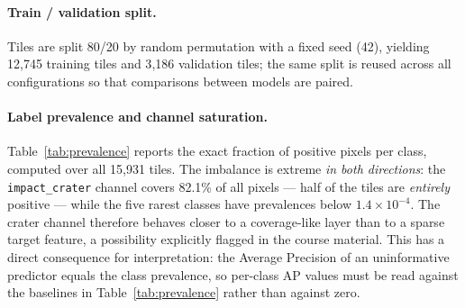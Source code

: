 \documentclass{aa}
\begin{document}
\paragraph{Train / validation split.}
Tiles are split 80/20 by random permutation with a fixed seed (42), yielding 12{,}745 training tiles and 3{,}186 validation tiles; the same split is reused across all configurations so that comparisons between models are paired.

\paragraph{Label prevalence and channel saturation.}
Table~\ref{tab:prevalence} reports the exact fraction of positive pixels per class, computed over all 15{,}931 tiles. The imbalance is extreme \emph{in both directions}: the \texttt{impact\_crater} channel covers 82.1\% of all pixels --- half of the tiles are \emph{entirely} positive --- while the five rarest classes have prevalences below $1.4\times10^{-4}$. The crater channel therefore behaves closer to a coverage-like layer than to a sparse target feature, a possibility explicitly flagged in the course material. This has a direct consequence for interpretation: the Average Precision of an uninformative predictor equals the class prevalence, so per-class AP values must be read against the baselines in Table~\ref{tab:prevalence} rather than against zero.

\begin{table}[htbp]
\centering
\caption{Per-class positive-pixel prevalence over the full dataset (15{,}931 tiles, $1.04\times10^9$ pixels per channel). The prevalence is also the AP of an uninformative (chance-level) predictor for that class.}
\label{tab:prevalence}
\end{table}
\end{document}
